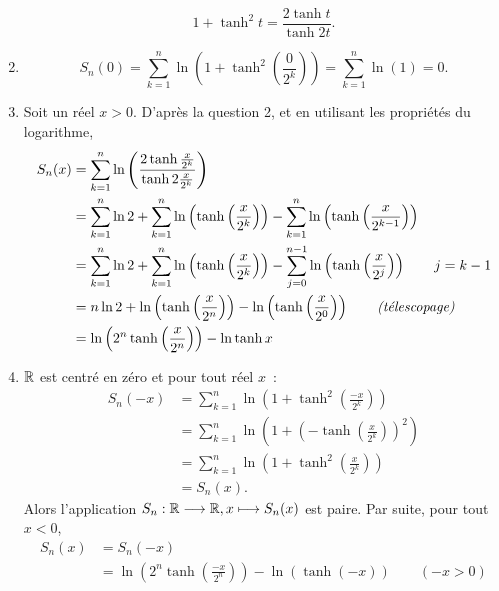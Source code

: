 \begin{corrige}
\begin{enumerate}
\begin{equation*}
        1+\tanh^2 t = \frac{2\tanh t}{\tanh 2t}.
      \end{equation*}
    \item
      \begin{equation*}
        S_n(0) = \sum_{k=1}^{n} 
        \ln\left(1+\tanh^2\left(\frac{0}{2^k}\right)\right) = 
        \sum_{k=1}^{n}\ln(1) = 0.
      \end{equation*}
    \item Soit un réel \(x>0\). D'après la question 2, et en utilisant les 
      propriétés du logarithme,
      \begin{align*}
        S_n(x)  &= \sum_{k=1}^{n} \ln\left(\frac{2\tanh \frac{x}{2^k}}{\tanh 
        2\frac{x}{2^k}}\right) \\
        &= \sum_{k=1}^{n} \ln 2 + \sum_{k=1}^{n} 
        \ln\left(\tanh\left(\frac{x}{2^k}\right)\right) - \sum_{k=1}^{n} 
        \ln\left(\tanh\left(\frac{x}{2^{k-1}}\right)\right) \\
        &=  \sum_{k=1}^{n} \ln 2 + \sum_{k=1}^{n} 
        \ln\left(\tanh\left(\frac{x}{2^k}\right)\right) - \sum_{j=0}^{n-1} 
        \ln\left(\tanh\left(\frac{x}{2^{j}}\right)\right) \qquad j=k-1 \\
        &= n\ln 2 + \ln\left(\tanh\left(\frac{x}{2^n}\right)\right) - 
        \ln\left(\tanh\left(\frac{x}{2^0}\right)\right) \qquad 
        \text{\emph{(télescopage)}}\\
        &= \ln\left(2^n\tanh\left(\frac{x}{2^n}\right)\right) - \ln\tanh x
      \end{align*}
    \item \(\mathbb{R}\) est centré en zéro et pour tout réel \(x\)~:
      \begin{align*}
        S_n(-x) &= 
        \sum_{k=1}^{n}\ln\left(1+\tanh^2\left(\frac{-x}{2^k}\right)\right) \\
        &= 
        \sum_{k=1}^{n}\ln\left(1+\left(-\tanh\left(\frac{x}{2^k}\right)\right)^2\right) 
        \\
        &= \sum_{k=1}^{n}\ln\left(1+\tanh^2\left(\frac{x}{2^k}\right)\right) \\
        &= S_n(x).
      \end{align*}
      Alors l'application \(S_n:\mathbb{R} \longrightarrow \mathbb{R}, x \longmapsto S_n(x)\) est paire. Par 
      suite, pour tout \(x < 0\),
      \begin{align*}
        S_n(x)  &= S_n(-x) \\
        &= \ln\left(2^n\tanh\left(\frac{-x}{2^n}\right)\right) - \ln(\tanh(-x)) 
        \qquad (-x>0)\\

\end{align*}
\end{enumerate}
\end{corrige}
